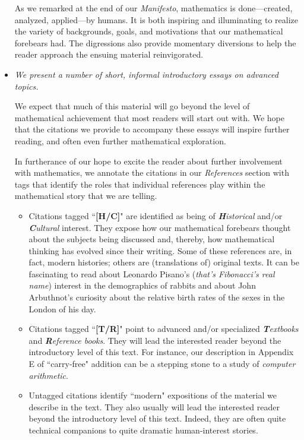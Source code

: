 \begin{itemize}
\smallskip

As we remarked at the end of our {\it Manifesto}, mathematics is done---created, analyzed, applied---by humans.  It is both inspiring and illuminating to realize the variety of backgrounds, goals, and motivations that our mathematical forebears had.  The digressions also provide momentary diversions to help the reader approach the ensuing material reinvigorated.

\medskip\item
{\em We present a number of short, informal introductory essays on advanced topics.}

\smallskip

We expect that much of this material will go beyond the level of mathematical achievement that most readers will start out with.  We hope that the citations we provide to accompany these essays will inspire further reading, and often even further mathematical exploration.

\smallskip

In furtherance of our hope to excite the reader about further involvement with mathematics, we annotate the citations in our {\it References} section with tags that identify the roles that individual references play within the mathematical story that we are telling.
  \begin{itemize}
  \item
Citations tagged ``{\bf [H/C]}" are identified as being of {\em {\bf H}istorical} and/or 
{\em {\bf C}ultural} interest.  They expose how our mathematical forebears thought about the subjects being discussed and, thereby, how mathematical thinking has evolved since their writing.  Some of these references are, in fact, modern histories; others are (translations of) original texts.  It can be fascinating to read about Leonardo Pisano's ({\em that's Fibonacci's real name}) interest in the demographics of rabbits and about John Arbuthnot's curiosity about the relative birth rates of the sexes in the London of his day.

  \medskip\item
Citations tagged ``{\bf [T/R]}" point to advanced and/or specialized {\em {\bf T}extbooks} and {\em {\bf R}eference books}.  They will lead the interested reader beyond the introductory level of this text.  For instance, our description in Appendix E of ``carry-free" addition can be a stepping stone to a study of {\em computer arithmetic}.

  \medskip\item
Untagged citations identify ``modern" expositions of the material we describe in the text.  They also usually will lead the interested reader beyond the introductory level of this text.  Indeed, they are often quite technical companions to quite dramatic human-interest stories.
  \end{itemize}


\end{itemize}
